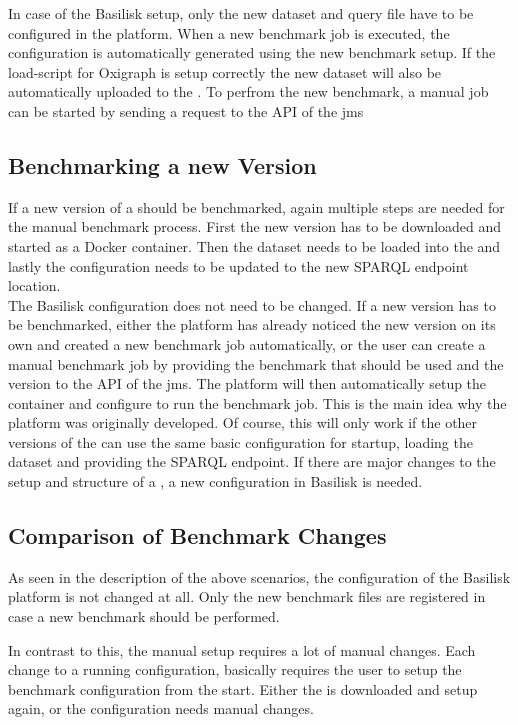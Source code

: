 In case of the Basilisk setup, only the new dataset and query file have to be configured in the platform.
When a new benchmark job is executed, the \iguana{} configuration is automatically generated using the new benchmark setup.
If the load-script for Oxigraph is setup correctly the new dataset will also be automatically uploaded to the \ts{}.
To perfrom the new benchmark, a manual job can be started by sending a request to the API of the \ac{jms}


\subsection{Benchmarking a new Version}
If a new version of a \ts{} should be benchmarked, again multiple steps are needed for the manual benchmark process.
First the new version has to be downloaded and started as a Docker container.
Then the dataset needs to be loaded into the \ts{} and lastly the \iguana{} configuration needs to be updated to the new SPARQL endpoint location.
\\

The Basilisk configuration does not need to be changed.
If a new version has to be benchmarked, either the platform has already noticed the new version on its own and created a new benchmark job automatically, or the user can create a manual benchmark job by providing the benchmark that should be used and the \ts{} version to the API of the \ac{jms}.
The platform will then automatically setup the container and configure \iguana{} to run the benchmark job.
This is the main idea why the platform was originally developed.
Of course, this will only work if the other versions of the \ts{} can use the same basic configuration for startup, loading the dataset and providing the SPARQL endpoint.
If there are major changes to the setup and structure of a \ts{}, a new configuration in Basilisk is needed.


\subsection{Comparison of Benchmark Changes}
As seen in the description of the above scenarios, the \ts{} configuration of the Basilisk platform is not changed at all.
Only the new benchmark files are registered in case a new benchmark should be performed.

In contrast to this, the manual setup requires a lot of manual changes.
Each change to a running configuration, basically requires the user to setup the benchmark configuration from the start.
Either the \ts{} is downloaded and setup again, or the \iguana{} configuration needs manual changes.


